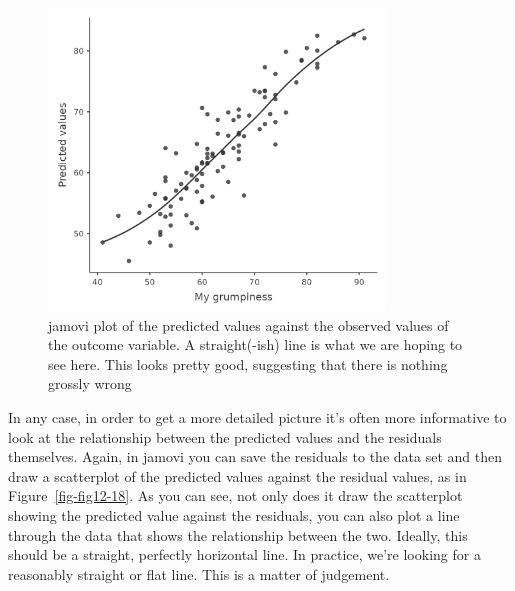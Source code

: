 \documentclass[
  a4paper,
]{book}
\begin{document}
\begin{figure}[h!]

\includegraphics[width=0.8\textwidth,height=\textheight]{images/fig12-17.png} \hfill{}

\caption{\label{fig-fig12-17}jamovi plot of the predicted values against
the observed values of the outcome variable. A straight(-ish) line is
what we are hoping to see here. This looks pretty good, suggesting that
there is nothing grossly wrong}

\end{figure}

In any case, in order to get a more detailed picture it's often more
informative to look at the relationship between the predicted values and
the residuals themselves. Again, in jamovi you can save the residuals to
the data set and then draw a scatterplot of the predicted values against
the residual values, as in Figure~\ref{fig-fig12-18}. As you can see,
not only does it draw the scatterplot showing the predicted value
against the residuals, you can also plot a line through the data that
shows the relationship between the two. Ideally, this should be a
straight, perfectly horizontal line. In practice, we're looking for a
reasonably straight or flat line. This is a matter of judgement.
\end{document}
